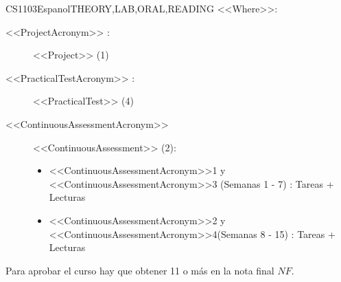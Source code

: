 \begin{evaluation}{CS1103}{Espanol}{THEORY,LAB,ORAL,READING}
  \vspace{2mm}
  \noindent <<Where>>:
  \begin{description}
    \item[<<ProjectAcronym>> :] <<Project>> (1)
    \item[<<PracticalTestAcronym>> :] <<PracticalTest>> (4)
    \item[<<ContinuousAssessmentAcronym>>] <<ContinuousAssessment>> (2):
      \begin{itemize}
          \item <<ContinuousAssessmentAcronym>>1 y <<ContinuousAssessmentAcronym>>3 (Semanas 1 - 7) : Tareas + Lecturas
          \item <<ContinuousAssessmentAcronym>>2 y <<ContinuousAssessmentAcronym>>4(Semanas 8 - 15) : Tareas + Lecturas
      \end{itemize}
  \end{description}

  \noindent Para aprobar el curso hay que obtener 11 o más en la nota final $NF$.
  \end{evaluation}
 
